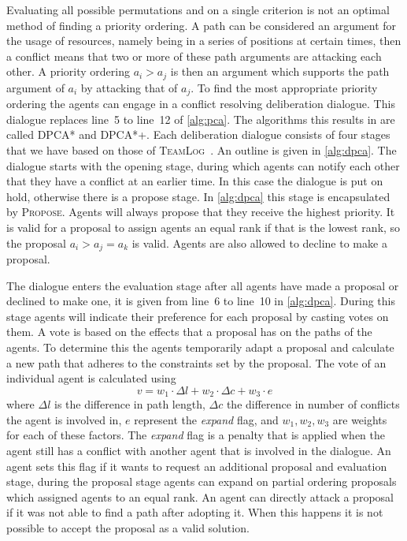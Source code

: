 Evaluating all possible permutations and on a single
criterion is not an optimal method of finding a priority ordering. A path can 
be 
considered an argument for the usage of resources, namely being in a series of 
positions at certain times, then a conflict means that two or more of these path 
arguments are attacking each other. A 
priority ordering $a_i > a_j$ is then an argument which supports the path 
argument 
of $a_i$ by attacking that of $a_j$. To find the most appropriate priority 
ordering the agents can engage in a conflict resolving deliberation dialogue. 
This 
dialogue replaces line~5 to line~12 of \autoref{alg:pca}.
The algorithms this results in are called DPCA* and DPCA*+. Each deliberation 
dialogue consists of four stages that we have based on those of 
\textsc{TeamLog}~\cite{dunin-keplicz2011}. An outline is given in \autoref{alg:dpca}. The dialogue 
starts with the opening stage, during which agents can notify each other that 
they have a conflict at an earlier time. In this case the dialogue is put on 
hold, otherwise there is a propose stage. In \autoref{alg:dpca} 
this stage is encapsulated by \textsc{Propose}. Agents will always propose that 
they receive the highest priority. It is valid for a proposal to assign agents 
an equal rank if that is the lowest rank, so the proposal $a_i > a_j = a_k$ is 
valid. Agents are 
also allowed to decline to make a proposal.

The dialogue enters the evaluation stage after all agents have made a 
proposal or declined to make one, it is given from line~6 to line~10 in 
\autoref{alg:dpca}. During this stage agents will indicate their preference for 
each proposal by casting votes on them. A vote is based on the effects that a 
proposal has on the paths of the agents. To determine this the agents 
temporarily adapt a proposal and calculate a new path that adheres to the 
constraints set by the proposal.
The vote of an individual agent is calculated using
\[ v = w_1 \cdot \Delta l + w_2 \cdot \Delta c + w_3 \cdot e \]
where $\Delta l$ is the difference in path length, $\Delta c$ the difference in 
number of conflicts the agent is involved in, $e$ represent the \emph{expand} 
flag, and $w_1, w_2, w_3$ are weights for each of these factors. The 
\emph{expand} flag is a penalty that is applied when the agent still has a 
conflict with another agent that is involved in 
the dialogue. An agent sets this flag if it wants to request an additional 
proposal and evaluation stage, during the proposal stage agents can expand on 
partial ordering proposals which assigned agents to an equal rank. An agent can 
directly attack a proposal if it was not able to find a path after adopting it. 
When this happens it is not possible to accept the proposal as a valid solution.

